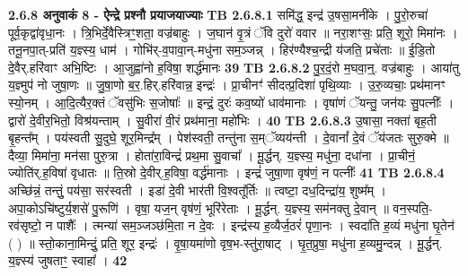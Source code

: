 \documentclass[17pt]{extarticle}
\begin{document}
                \textbf{ 2.6.8     अनुवाकं   8 - ऐन्द्रे प्रश्नौ प्रयाजयाज्याः} \newline
                                \textbf{ TB 2.6.8.1} \newline
                  समि॑द्ध॒ इन्द्र॑ उ॒षसा॒मनी॑के । पु॒रो॒रुचा॑ पूर्व॒कृद्वा॑वृधा॒नः । त्रि॒भिर्दे॒वैस्त्रिꣳ॒॒शता॒ वज्र॑बाहुः । ज॒घान॑ वृ॒त्रं ॅवि दुरो॑ ववार ॥ नरा॒शꣳसः॒ प्रति॒ शूरो॒ मिमा॑नः । तनू॒नपा॒त्-प्रति॑ य॒ज्ञ्स्य॒ धाम॑ । गोभि॑र्-व॒पावा॒न्-मधु॑ना सम॒ञ्जन्न् । हिर॑ण्यैश्च॒न्द्री य॑जति॒ प्रचे॑ताः ॥ ई॒डि॒तो दे॒वैर्.हरि॑वाꣳ अभि॒ष्टिः । आ॒जुह्वा॑नो ह॒विषा॒ शर्द्ध॑मानः \textbf{ 39} \newline
                  \newline
                                \textbf{ TB 2.6.8.2} \newline
                  पु॒र॒दं॒रो म॒घवा॒न्॒. वज्र॑बाहुः । आया॑तु य॒ज्ञ्मुप॑ नो जुषा॒णः ॥ जु॒षा॒णो ब॒र॒.हिर्.हरि॑वान्न॒ इन्द्रः॑ । प्रा॒चीनꣳ॑ सीदत्प्र॒दिशा॑ पृथि॒व्याः । उ॒रु॒व्यचाः॒ प्रथ॑मानꣳ स्यो॒नम् । आ॒दि॒त्यैर॒क्तं ॅवसु॑भिः स॒जोषाः᳚ ॥ इन्द्रं॒ दुरः॑ कव॒ष्यो॑ धाव॑मानाः । वृषा॑णं ॅयन्तु॒ जन॑यः सु॒पत्नीः᳚ । द्वारो॑ दे॒वीर॒भितो॒ विश्र॑यन्ताम् । सु॒वीरा॑ वी॒रं प्रथ॑माना॒ महो॑भिः । \textbf{ 40} \newline
                  \newline
                                \textbf{ TB 2.6.8.3} \newline
                  उ॒षासा॒ नक्ता॑ बृह॒ती बृ॒हन्त᳚म् । पय॑स्वती सु॒दुघे॒ शूर॒मिन्द्र᳚म् । पेश॑स्वती॒ तन्तु॑ना स॒म्ॅव्यय॑न्ती । दे॒वानां᳚ दे॒वं ॅय॑जतः सुरु॒क्मे ॥ दैव्या॒ मिमा॑ना॒ मन॑सा पुरु॒त्रा । होता॑रा॒विन्द्रं॑ प्रथ॒मा सु॒वाचा᳚ । मू॒र्द्धन्. य॒ज्ञ्स्य॒ मधु॑ना॒ दधा॑ना । प्रा॒चीनं॒ ज्योति॑र्.ह॒विषा॑ वृधातः ॥ ति॒स्रो दे॒वीर्.ह॒विषा॒ वर्द्ध॑मानाः । इन्द्रं॑ जुषा॒णा वृष॑णं॒ न पत्नीः᳚ \textbf{ 41} \newline
                  \newline
                                \textbf{ TB 2.6.8.4} \newline
                  अच्छि॑न्नं॒ तन्तुं॒ पय॑सा॒ सर॑स्वती । इडा॑ दे॒वी भार॑ती वि॒श्वतू᳚र्तिः ॥ त्वष्टा॒ दध॒दिन्द्रा॑य॒ शुष्म᳚म् । अपा॒कोऽचि॑ष्टुर्य॒शसे॑ पु॒रूणि॑ । वृषा॒ यज॒न् वृष॑णं॒ भूरि॑रेताः । मू॒र्द्धन्. य॒ज्ञ्स्य॒ सम॑नक्तु दे॒वान् ॥ वन॒स्पति॒-रव॑सृष्टो॒ न पाशैः᳚ । त्मन्या॑ सम॒ञ्जञ्छ॑मि॒ता न दे॒वः । इन्द्र॑स्य ह॒व्यैर्ज॒ठरं॑ पृणा॒नः । स्वदा॑ति ह॒व्यं मधु॑ना घृ॒तेन॑ ( ) ॥ स्तो॒काना॒मिन्दुं॒ प्रति॒ शूर॒ इन्द्रः॑ । वृ॒षा॒यमा॑णो वृष॒भ-स्तु॑रा॒षाट् । घृ॒त॒प्रुषा॒ मधु॑ना ह॒व्यमु॒न्दन्न् । मू॒र्द्धन्. य॒ज्ञ्स्य॑ जुषताꣳ॒॒ स्वाहा᳚ । \textbf{ 42} \newline
\end{document}
